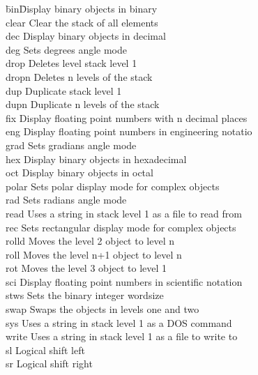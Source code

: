 \documentclass{report}
\begin{document}
\begin{tabbing}
\hspace*{3em}\=bin\hspace{3em}\=Display binary objects in binary\\
\>             clear\>          Clear the stack of all elements\\
\>             dec\>            Display binary objects in decimal\\
\>             deg\>            Sets degrees angle mode\\
\>             drop\>           Deletes level stack level 1\\
\>             dropn\>          Deletes n levels of the stack\\
\>             dup\>            Duplicate stack level 1\\
\>             dupn\>           Duplicate n levels of the stack\\
\>             fix\>            Display floating point numbers with n decimal places\\
\>             eng\>            Display floating point numbers in engineering notatio\\
\>             grad\>           Sets gradians angle mode\\
\>             hex\>            Display binary objects in hexadecimal\\
\>             oct\>            Display binary objects in octal\\
\>             polar\>          Sets polar display mode for complex objects\\
\>             rad\>            Sets radians angle mode\\
\>             read\>           Uses a string in stack level 1 as a file to read from\\
\>             rec\>            Sets rectangular display mode for complex objects\\
\>             rolld\>          Moves the level 2 object to level n\\
\>             roll\>           Moves the level n+1 object to level n\\
\>             rot\>            Moves the level 3 object to level 1\\
\>             sci\>            Display floating point numbers in scientific notation\\
\>             stws\>           Sets the binary integer wordsize\\
\>             swap\>           Swaps the objects in levels one and two\\
\>             sys\>            Uses a string in stack level 1 as a DOS command\\
\>             write\>          Uses a string in stack level 1 as a file to write to\\
\>             sl\>             Logical shift left\\
\>             sr\>             Logical shift right\\
\end{tabbing}
\end{document}
